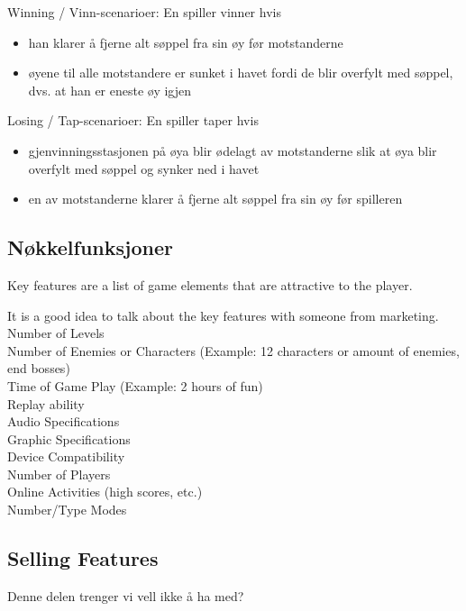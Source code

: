 Winning / Vinn-scenarioer:
En spiller vinner hvis
\begin{itemize}
	\item han klarer å fjerne alt søppel fra sin øy før motstanderne
	\item øyene til alle motstandere er sunket i havet fordi de blir overfylt med søppel, dvs. at han er eneste øy igjen
\end{itemize}

Losing / Tap-scenarioer:
En spiller taper hvis
\begin{itemize}
	\item gjenvinningsstasjonen på øya blir ødelagt av motstanderne slik at øya blir overfylt med søppel og synker ned i havet
	\item en av motstanderne klarer å fjerne alt søppel fra sin øy før spilleren
\end{itemize}

\subsection{Nøkkelfunksjoner}

Key features are a list of game elements that are attractive to the player.

It is a good idea to talk about the key features with someone from marketing.\\
Number of Levels\\
Number of Enemies or Characters (Example: 12 characters or amount of enemies, end bosses)\\
Time of Game Play (Example: 2 hours of fun)\\
Replay ability \\
Audio Specifications\\
Graphic Specifications\\
Device Compatibility\\
Number of Players\\
Online Activities (high scores, etc.)\\
Number/Type Modes

\subsection{Selling Features}

Denne delen trenger vi vell ikke å ha med?


